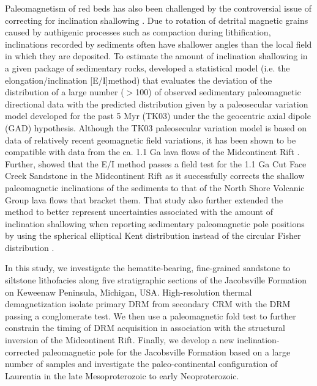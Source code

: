 \documentclass[draft]{agujournal2019}
\begin{document}
Paleomagnetism of red beds has also been challenged by the controversial issue of correcting for inclination shallowing \cite{King1955a, Tauxe2004b, Bilardello2016b}. Due to rotation of detrital magnetic grains caused by authigenic processes such as compaction during lithification, inclinations recorded by sediments often have shallower angles than the local field in which they are deposited. To estimate the amount of inclination shallowing in a given package of sedimentary rocks,  developed a statistical model (i.e. the elongation/inclination [E/I]method) that evaluates the deviation of the distribution of a large number ($>$100) of observed sedimentary paleomagnetic directional data with the predicted distribution given by a paleosecular variation model developed for the past 5 Myr (TK03) under the the geocentric axial dipole (GAD) hypothesis. Although the TK03 paleosecular variation model is based on data of relatively recent geomagnetic field variations, it has been shown to be compatible with data from the ca. 1.1 Ga lava flows of the Midcontinent Rift \cite{Tauxe2009a}. Further,  showed that the E/I method passes a field test for the 1.1 Ga Cut Face Creek Sandstone in the Midcontinent Rift as it successfully corrects the shallow paleomagnetic inclinations of the sediments to that of the North Shore Volcanic Group lava flows that bracket them. That study also further extended the method to better represent uncertainties associated with the amount of inclination shallowing when reporting sedimentary paleomagnetic pole positions by using the spherical elliptical Kent distribution \cite{Kent1982a} instead of the circular Fisher distribution \cite{Fisher1953a}. 

In this study, we investigate the hematite-bearing, fine-grained sandstone to siltstone lithofacies along five stratigraphic sections of the Jacobsville Formation on Keweenaw Peninsula, Michigan, USA. High-resolution thermal demagnetization isolate primary DRM from secondary CRM with the DRM passing a conglomerate test. We then use a paleomagnetic fold test to further constrain the timing of DRM acquisition in association with the structural inversion of the Midcontinent Rift. Finally, we develop a new inclination-corrected paleomagnetic pole for the Jacobsville Formation based on a large number of samples and investigate the paleo-continental configuration of Laurentia in the late Mesoproterozoic to early Neoproterozoic.


\end{document}
